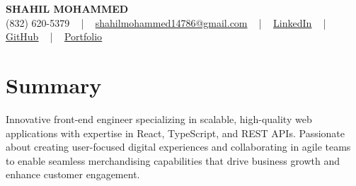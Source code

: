 \documentclass[letterpaper,10pt]{article}
\begin{document}
\begin{center}
    {\fontsize{14pt}{12pt}\selectfont \textbf{\MakeUppercase{Shahil Mohammed}}}\\ \vspace{2pt}
    \fontsize{10pt}{12pt}\selectfont (832) 620-5379 ~ | ~ \href{mailto:shahilmohammed14786@gmail.com}{shahilmohammed14786@gmail.com} ~ | ~  
    \href{https://www.linkedin.com/in/shahil-mohammed-9652931a1/}{\color{blue}\underline{LinkedIn}}  ~ | ~ 
    \href{https://github.com/freakbeast14}{\color{blue}\underline{GitHub}} ~ | ~ 
    \href{https://shahil-mohammed.netlify.app/}{\color{blue}\underline{Portfolio}}
    \vspace{-8pt}
\end{center}

\section{Summary}
\vspace{-2pt}\fontsize{8pt}{9pt}\selectfont
Innovative front-end engineer specializing in scalable, high-quality web applications with expertise in React, TypeScript, and REST APIs. Passionate about creating user-focused digital experiences and collaborating in agile teams to enable seamless merchandising capabilities that drive business growth and enhance customer engagement.
 \vspace{-5pt}
 
\vspace{-2pt}
\end{document}
